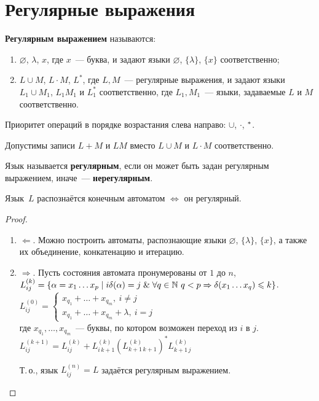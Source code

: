 \section{Регулярные выражения}
 \textbf{Регулярным выражением} называются:
\begin{enumerate}
	\item $\varnothing$, $\lambda$, $x$, где $x$~--- буква, и задают языки $\varnothing$, $\{ \lambda \}$, $\{ x \}$ соответственно;
	\item $L \cup M$, $L \cdot M$, $L^*$, где $L, M$~--- регулярные выражения, и задают языки $L_1 \cup M_1$, $L_1 M_1$ и $L_1^*$ соответственно, где $L_1, M_1$~--- языки, задаваемые $L$ и $M$ соответственно.
\end{enumerate}

Приоритет операций в порядке возрастания слева направо: $\cup$, $\cdot$, $\vphantom{L}^*$.

Допустимы записи $L + M$ и $LM$ вместо $L \cup M$ и $L \cdot M$ соответственно.

 Язык называется \textbf{регулярным}, если он может быть задан регулярным выражением, иначе~--- \textbf{нерегулярным}.

\begin{theorem}[Клини]
Язык~$L$ распознаётся конечным автоматом $\Leftrightarrow$ он регулярный.
\end{theorem}
\begin{proof}
\begin{enumerate}
	\item $\Leftarrow$. Можно построить автоматы, распознающие языки $\varnothing$, $\{ \lambda \}$, $\{ x \}$, а также их объединение, конкатенацию и итерацию.
	\item $\Rightarrow$. Пусть состояния автомата пронумерованы от $1$ до $n$, $L_{ij}^{(k)} = \{ \alpha = x_1 \ldots x_p \mid i \delta(\alpha) = j \lAnd \forall q \in \mathbb N \ \allowbreak q < p \opbr\Rightarrow \delta(x_1 \ldots x_q) \leqslant k \}$.
		\indbase $L_{ij}^{(0)} =
		\begin{cases}
		x_{q_1} + \ldots + x_{q_m}, \ i \neq j \\
		x_{q_1} + \ldots + x_{q_m} + \lambda, \ i = j
		\end{cases}$\\
		где $x_{q_1}, \ldots, x_{q_m}$~--- буквы, по котором возможен переход из $i$ в $j$.
		\indstep $L_{ij}^{(k+1)} = L_{ij}^{(k)} + L_{i\,k+1}^{(k)} \left( L_{k+1\,k+1}^{(k)} \right)^* L_{k+1\,j}^{(k)}$
		\indend
		
	Т.\,о., язык $L_{ij}^{(n)} = L$ задаётся регулярным выражением.
\end{enumerate}
\end{proof}


